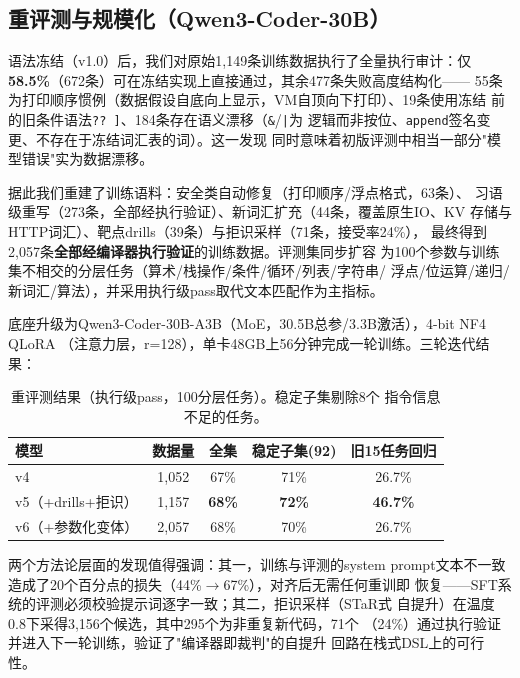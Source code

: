 \documentclass[11pt,a4paper]{ctexart}
\begin{document}
\subsection{重评测与规模化（Qwen3-Coder-30B）}
\label{sec:reeval}

语法冻结（v1.0）后，我们对原始1,149条训练数据执行了全量执行审计：仅
\textbf{58.5\%}（672条）可在冻结实现上直接通过，其余477条失败高度结构化——
55条为打印顺序惯例（数据假设自底向上显示，VM自顶向下打印）、19条使用冻结
前的旧条件语法\texttt{?? ]}、184条存在语义漂移（\texttt{\&}/\texttt{|}为
逻辑而非按位、\texttt{append}签名变更、不存在于冻结词汇表的词）。这一发现
同时意味着初版评测中相当一部分"模型错误"实为数据漂移。

据此我们重建了训练语料：安全类自动修复（打印顺序/浮点格式，63条）、
习语级重写（273条，全部经执行验证）、新词汇扩充（44条，覆盖原生IO、KV
存储与HTTP词汇）、靶点drills（39条）与拒识采样（71条，接受率24\%），
最终得到2,057条\textbf{全部经编译器执行验证}的训练数据。评测集同步扩容
为100个参数与训练集不相交的分层任务（算术/栈操作/条件/循环/列表/字符串/
浮点/位运算/递归/新词汇/算法），并采用执行级pass取代文本匹配作为主指标。

底座升级为Qwen3-Coder-30B-A3B（MoE，30.5B总参/3.3B激活），4-bit NF4 QLoRA
（注意力层，r=128），单卡48GB上56分钟完成一轮训练。三轮迭代结果：

\begin{table}[h]
\centering
\caption{重评测结果（执行级pass，100分层任务）。稳定子集剔除8个
指令信息不足的任务。}
\begin{tabular}{lcccc}
\toprule
模型 & 数据量 & 全集 & 稳定子集(92) & 旧15任务回归 \\
\midrule
v4 & 1,052 & 67\% & 71\% & 26.7\% \\
v5（+drills+拒识） & 1,157 & \textbf{68\%} & \textbf{72\%} & \textbf{46.7\%} \\
v6（+参数化变体） & 2,057 & 68\% & 70\% & 26.7\% \\
\bottomrule
\end{tabular}
\end{table}

两个方法论层面的发现值得强调：其一，训练与评测的system prompt文本不一致
造成了20个百分点的损失（44\%$\rightarrow$67\%），对齐后无需任何重训即
恢复——SFT系统的评测必须校验提示词逐字一致；其二，拒识采样（STaR式
自提升）在温度0.8下采得3,156个候选，其中295个为非重复新代码，71个
（24\%）通过执行验证并进入下一轮训练，验证了"编译器即裁判"的自提升
回路在栈式DSL上的可行性。

\end{document}
